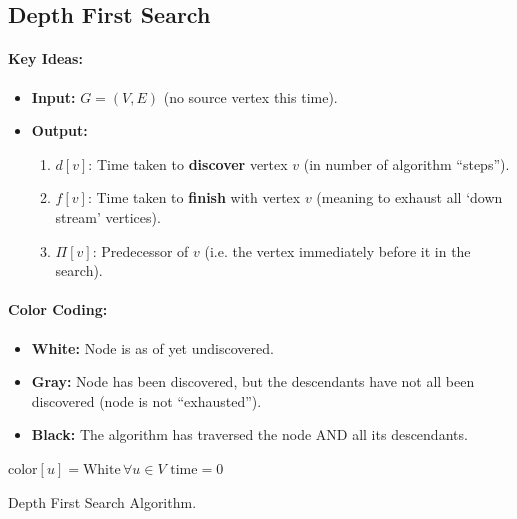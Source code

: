 \documentclass[a4paper,12pt]{report}
\begin{document}
\subsection{Depth First Search}

\paragraph{Key Ideas: } 
\begin{itemize}
\item \textbf{Input: } $G = (V,E)$ (no source vertex this time).
\item \textbf{Output: } 
\begin{enumerate}
\item $d[v]$: Time taken to \textbf{discover} vertex $v$ (in number of algorithm ``steps'').
\item $f[v]$: Time taken to \textbf{finish} with vertex $v$ (meaning to exhaust all `down stream' vertices).
\item $\Pi[v]$: Predecessor of $v$ (i.e. the vertex immediately before it in the search).
\end{enumerate}
\end{itemize}

\paragraph{Color Coding: } 
\begin{itemize}
\item \textbf{White: } Node is as of yet undiscovered.
\item \textbf{Gray: } Node has been discovered, but the descendants have not all been discovered (node is not ``exhausted'').
\item \textbf{Black: } The algorithm has traversed the node AND all its descendants. 
\end{itemize}

\begin{algorithm}[H]
\SetAlgoLined
{}
	\BlankLine
	\BlankLine
	$\text{color}[u] = \text{White}\,\forall u\in V$\;
	$\text{time} = 0$\;
	\caption{Depth First Search Algorithm.}
\end{algorithm}
\end{document}
